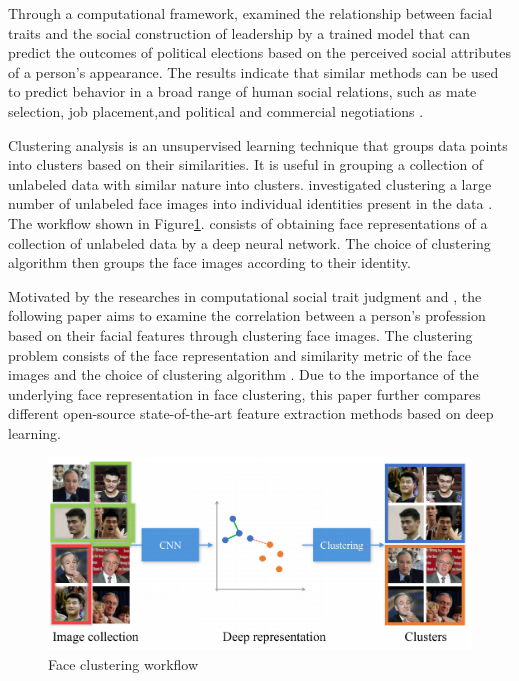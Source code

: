 \documentclass[12pt,english]{article}
\begin{document}
Through a computational framework, \cite{joo} examined the relationship between facial traits and the social construction of leadership by a trained model that can predict the outcomes of political elections based on the perceived social attributes of a person's appearance. The results indicate that similar methods can be used to predict behavior in a broad range of human social relations, such as mate selection, job placement,and political and commercial negotiations \cite{joo}.

Clustering analysis is an unsupervised learning technique that groups data points into clusters based on their similarities. It is useful in grouping a collection of unlabeled data with similar nature into clusters. \cite{shi} investigated clustering a large number of unlabeled face images into individual identities present in the data \cite{shi}. The workflow shown in Figure\ref{fig:face}. consists of obtaining face representations of a collection of unlabeled data by a deep neural network. The choice of clustering algorithm then groups the face images according to their identity.

Motivated by the researches in computational social trait judgment and \cite{shi}, the following paper aims to examine the correlation between a person's profession based on their facial features through clustering face images. The clustering problem consists of the face representation and similarity metric of the face images and the choice of clustering algorithm \cite{shi}. Due to the importance of the underlying face representation in face clustering, this paper further compares different open-source state-of-the-art feature extraction methods based on deep learning.\\

\begin{figure}[!tbp]
 \centering
    \includegraphics[width=\textwidth]{figures/otto_faceClustering_workflow.png}
    \caption{Face clustering workflow \cite{shi}}
	\label{fig:face}
\end{figure}
\end{document}
